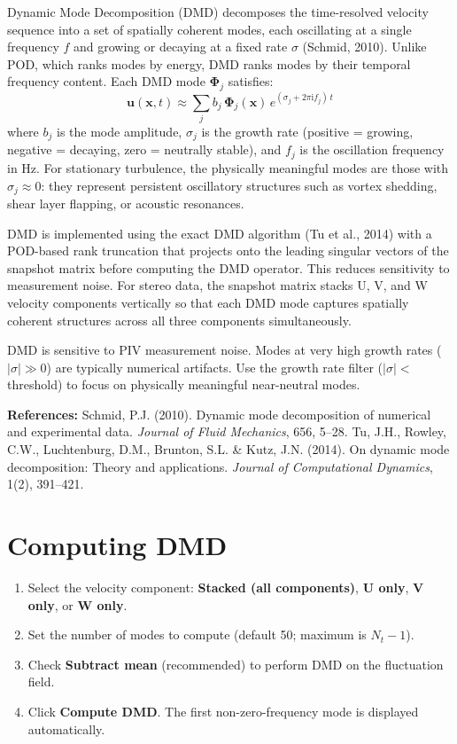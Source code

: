 \documentclass[11pt, a4paper]{report}
\newcommand{\uipth}[1]{\textbf{\textcolor{upblue}{#1}}}
\begin{document}
Dynamic Mode Decomposition (DMD) decomposes the time-resolved velocity sequence into a set of spatially coherent modes, each oscillating at a single frequency $f$ and growing or decaying at a fixed rate $\sigma$ (Schmid, 2010). Unlike POD, which ranks modes by energy, DMD ranks modes by their temporal frequency content. Each DMD mode $\boldsymbol{\Phi}_j$ satisfies:
\[
\mathbf{u}(\mathbf{x}, t) \approx \sum_j b_j\, \boldsymbol{\Phi}_j(\mathbf{x})\, e^{(\sigma_j + 2\pi \mathrm{i} f_j)\,t}
\]
where $b_j$ is the mode amplitude, $\sigma_j$ is the growth rate (positive = growing, negative = decaying, zero = neutrally stable), and $f_j$ is the oscillation frequency in Hz. For stationary turbulence, the physically meaningful modes are those with $\sigma_j \approx 0$: they represent persistent oscillatory structures such as vortex shedding, shear layer flapping, or acoustic resonances.

DMD is implemented using the exact DMD algorithm (Tu et al., 2014) with a POD-based rank truncation that projects onto the leading singular vectors of the snapshot matrix before computing the DMD operator. This reduces sensitivity to measurement noise. For stereo data, the snapshot matrix stacks U, V, and W velocity components vertically so that each DMD mode captures spatially coherent structures across all three components simultaneously.

\begin{warnbox}
DMD is sensitive to PIV measurement noise. Modes at very high growth rates ($|\sigma| \gg 0$) are typically numerical artifacts. Use the growth rate filter ($|\sigma| <$ threshold) to focus on physically meaningful near-neutral modes.
\end{warnbox}

\noindent\textbf{References:} Schmid, P.J. (2010). Dynamic mode decomposition of numerical and experimental data. \textit{Journal of Fluid Mechanics}, 656, 5--28. Tu, J.H., Rowley, C.W., Luchtenburg, D.M., Brunton, S.L. \& Kutz, J.N. (2014). On dynamic mode decomposition: Theory and applications. \textit{Journal of Computational Dynamics}, 1(2), 391--421.

\section{Computing DMD}

\begin{stepbox}
\begin{enumerate}[leftmargin=1.5em, topsep=2pt]
  \item Select the velocity component: \uipth{Stacked (all components)}, \uipth{U only}, \uipth{V only}, or \uipth{W only}.
  \item Set the number of modes to compute (default 50; maximum is $N_t - 1$).
  \item Check \uipth{Subtract mean} (recommended) to perform DMD on the fluctuation field.
  \item Click \uipth{Compute DMD}. The first non-zero-frequency mode is displayed automatically.
\end{enumerate}
\end{stepbox}
\end{document}
